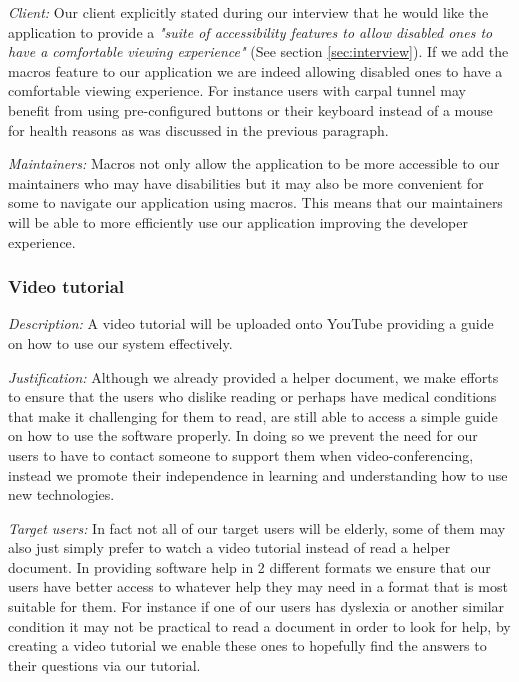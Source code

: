\textit{Client:}
Our client explicitly stated during our interview
that he would like the application to provide a
\textit{"suite of accessibility features to allow
disabled ones to have a comfortable viewing
experience"} (See section \ref{sec:interview}). If we add
the macros feature to our application we are indeed allowing
disabled ones to have a comfortable viewing experience. For
instance users with carpal tunnel may benefit from using
pre-configured buttons or their keyboard instead of a mouse
for health reasons as was discussed in the previous paragraph.
\\ \vspace{0.2cm}

\textit{Maintainers:}
Macros not only allow the application to be more accessible
to our maintainers who may have disabilities but it may
also be more convenient for some to navigate our application
using macros. This means that our maintainers will be able
to more efficiently use our application improving the
developer experience.
\\ \vspace{0.2cm}

\subsubsection{Video tutorial}

\textit{Description:}
A video tutorial will be uploaded onto YouTube providing a
guide on how to use our system effectively. \\ \vspace{0.2cm}

\textit{Justification:}
Although we already provided a helper document, we make
efforts to ensure that the users who dislike reading or
perhaps have medical conditions that make it challenging for
them to read, are still able to access a simple guide on
how to use the software properly. In doing so we prevent the
need for our users to have to contact someone to support them
when video-conferencing, instead we promote their
independence in learning and understanding how to use new
technologies. \\ \vspace{0.2cm}

\textit{Target users:}
In fact not all of our target users will be elderly, some of
them may also just simply prefer to watch a video tutorial instead
of read a helper document. In providing software help in 2 different
formats we ensure that our users have better access to whatever
help they may need in a format that is most suitable for them. For
instance if one of our users has dyslexia or another similar condition
it may not be practical to read a document in order to look for help,
by creating a video tutorial we enable these ones to hopefully find
the answers to their questions via our tutorial.
\\ \vspace{0.2cm}

